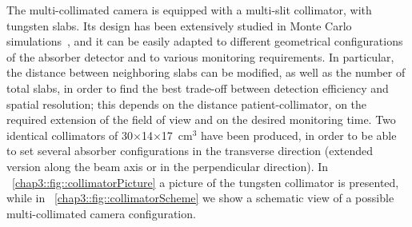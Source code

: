 The multi-collimated camera is equipped with a multi-slit collimator, with tungsten slabs. Its design has been extensively studied in Monte Carlo simulations~\parencite{Pinto2014}, and it can be easily adapted to different geometrical configurations of the absorber detector and to various monitoring requirements. In particular, the distance between neighboring slabs can be modified, as well as the number of total slabs, in order to find the best trade-off between detection efficiency and spatial resolution; this depends on the distance patient-collimator, on the required extension of the field of view and on the desired monitoring time. Two identical collimators of 30$\times$14$\times$17~cm$^{3}$ have been produced, in order to be able to set several absorber configurations in the transverse direction (extended version along the beam axis or in the perpendicular direction). In \figurename~\ref{chap3::fig::collimatorPicture} a picture of the tungsten collimator is presented, while in \figurename~\ref{chap3::fig::collimatorScheme} we show a schematic view of a possible multi-collimated camera configuration.\\

